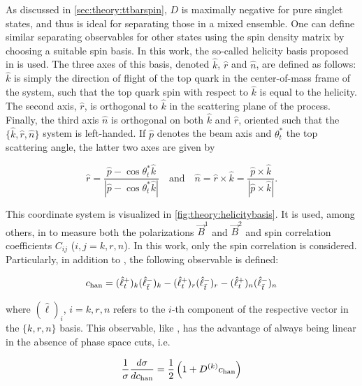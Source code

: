 As discussed in \cref{sec:theory:ttbarspin}, $D$ is maximally negative for pure singlet states, and thus is ideal for separating those in a mixed ensemble. One can define similar separating observables for other states using the spin density matrix by choosing a suitable spin basis. In this work, the so-called helicity basis proposed in  is used. The three axes of this basis, denoted $\hat{k}$, $\hat{r}$ and $\hat{n}$, are defined as follows: $\hat{k}$ is simply the direction of flight of the top quark in the center-of-mass frame of the \ttbar system, such that the top quark spin with respect to $\hat{k}$ is equal to the helicity. The second axis, $\hat{r}$, is orthogonal to $\hat{k}$ in the scattering plane of the \pptt process. Finally, the third axis $\hat{n}$ is orthogonal on both $\hat{k}$ and $\hat{r}$, oriented such that the $\{\hat{k},\hat{r},\hat{n}\}$ system is left-handed. If $\hat{p}$ denotes the beam axis and $\theta^*_t$ the top scattering angle, the latter two axes are given by

\begin{equation}
    \hat{r} = \frac{\hat{p} - \cos \theta^*_t \hat{k}} {| \hat{p} - \cos \theta^*_t \hat{k} |} \quad \mathrm{and} \quad \hat{n} = \hat{r} \times \hat{k} = \frac{\hat{p} \times \hat{k}} {| \hat{p} \times \hat{k} |}.
\end{equation}

This coordinate system is visualized in \cref{fig:theory:helicitybasis}. It is used, among others,  in  to measure both the polarizations $\vec{B}^1$ and $\vec{B}^2$ and spin correlation coefficients $C_{ij}$ ($i,j = k,r,n$). In this work, only the spin correlation is considered. Particularly, in addition to \chel, the following observable is defined:

\begin{equation}
    \label{eq:theory:chan}
    c_{\mathrm{han}} = (\hat{\ell}_t^+)_k (\hat{\ell}_{\bar{t}}^-)_k - (\hat{\ell}_t^+)_r (\hat{\ell}_{\bar{t}}^-)_r - (\hat{\ell}_t^+)_n (\hat{\ell}_{\bar{t}}^-)_n
\end{equation}

\noindent where $(\hat{\ell})_i$, $i=k,r,n$ refers to the $i$-th component of the respective vector in the $\{k,r,n\}$ basis. This observable, like \chel, has the advantage of always being linear in the absence of phase space cuts, i.e.

\begin{equation}
    \frac{1}{\sigma} \frac{d \sigma}{d c_{\mathrm{han}}} = \frac{1}{2}\left( 1 + D^{(k)} c_{\mathrm{han}} \right)
\end{equation}

